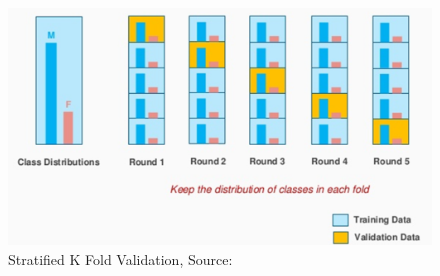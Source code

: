     \begin{figure}
        \centering
        \includegraphics[width=0.75\linewidth]{graphics//chapter3/stratified k fold.png}
        \caption{Stratified K Fold Validation, Source: \cite{WEBSITE:skfold-credit}}
        \label{fig:stratified-k-fold}
    \end{figure}
    


